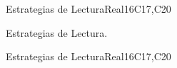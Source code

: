 \begin{syllabus}
\begin{unit}{Estrategias de Lectura}{}{Real}{16}{C17,C20}
  \begin{topics}
      \item Estrategias de Lectura.
  \end{topics}

  \begin{learningoutcomes}
   \item 
  \end{learningoutcomes}
\end{unit}


\begin{unit}{Estrategias de Lectura}{}{Real}{16}{C17,C20}
  \begin{topics}
      \item
  \end{topics}

  \begin{learningoutcomes}
   \item 
  \end{learningoutcomes}
\end{unit}

\begin{coursebibliography}
\end{coursebibliography}

\end{syllabus}
